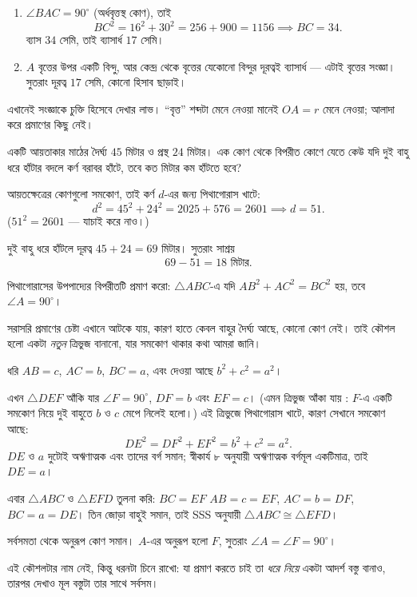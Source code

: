 \documentclass[11pt]{article}
\begin{document}
\begin{sol}
\begin{enumerate}
  \item $\angle BAC = 90^\circ$ (অর্ধবৃত্তস্থ কোণ), তাই
        \[
          BC^2 = 16^2 + 30^2 = 256 + 900 = 1156 \implies BC = 34 .
        \]
        ব্যাস $34$ সেমি, তাই ব্যাসার্ধ $17$ সেমি।
  \item $A$ বৃত্তের উপর একটি বিন্দু, আর কেন্দ্র থেকে বৃত্তের যেকোনো বিন্দুর
        দূরত্বই ব্যাসার্ধ --- এটাই বৃত্তের সংজ্ঞা। সুতরাং দূরত্ব $17$ সেমি,
        কোনো হিসাব ছাড়াই।
\end{enumerate}
এখানেই সংজ্ঞাকে চুক্তি হিসেবে দেখার লাভ। ``বৃত্ত'' শব্দটা মেনে নেওয়া মানেই
$OA = r$ মেনে নেওয়া; আলাদা করে প্রমাণের কিছু নেই।
\end{sol}

 একটি আয়তাকার মাঠের দৈর্ঘ্য $45$ মিটার ও প্রস্থ $24$ মিটার। এক কোণ থেকে
বিপরীত কোণে যেতে কেউ যদি দুই বাহু ধরে হাঁটার বদলে কর্ণ বরাবর হাঁটে, তবে কত মিটার
কম হাঁটতে হবে?

\begin{sol}
আয়তক্ষেত্রের কোণগুলো সমকোণ, তাই কর্ণ $d$-এর জন্য পিথাগোরাস খাটে:
\[
  d^2 = 45^2 + 24^2 = 2025 + 576 = 2601 \implies d = 51 .
\]
($51^2 = 2601$ --- যাচাই করে নাও।)

দুই বাহু ধরে হাঁটলে দূরত্ব $45 + 24 = 69$ মিটার। সুতরাং সাশ্রয়
\[
  69 - 51 = 18 \text{ মিটার}.
\]
\end{sol}

 পিথাগোরাসের উপপাদ্যের বিপরীতটি প্রমাণ করো: $\triangle ABC$-এ যদি
$AB^2 + AC^2 = BC^2$ হয়, তবে $\angle A = 90^\circ$।

\begin{sol}
সরাসরি প্রমাণের চেষ্টা এখানে আটকে যায়, কারণ হাতে কেবল বাহুর দৈর্ঘ্য আছে, কোনো
কোণ নেই। তাই কৌশল হলো একটা \emph{নতুন} ত্রিভুজ বানানো, যার সমকোণ থাকার কথা আমরা
জানি।

ধরি $AB = c$, $AC = b$, $BC = a$, এবং দেওয়া আছে $b^2 + c^2 = a^2$।

এখন $\triangle DEF$ আঁকি যার $\angle F = 90^\circ$, $DF = b$ এবং $EF = c$।
(এমন ত্রিভুজ আঁকা যায় : $F$-এ একটি সমকোণ নিয়ে দুই বাহুতে $b$ ও $c$ মেপে
নিলেই হলো।) এই ত্রিভুজে পিথাগোরাস খাটে, কারণ সেখানে সমকোণ আছে:
\[
  DE^2 = DF^2 + EF^2 = b^2 + c^2 = a^2 .
\]
$DE$ ও $a$ দুটোই অঋণাত্মক এবং তাদের বর্গ সমান; স্বীকার্য ৮ অনুযায়ী অঋণাত্মক
বর্গমূল একটিমাত্র, তাই $DE = a$।

এবার $\triangle ABC$ ও $\triangle EFD$ তুলনা করি: $BC = EF$ $AB = c = EF$, $AC = b = DF$, $BC = a = DE$। তিন জোড়া বাহুই সমান, তাই
SSS অনুযায়ী $\triangle ABC \cong \triangle EFD$।

সর্বসমতা থেকে অনুরূপ কোণ সমান। $A$-এর অনুরূপ হলো $F$, সুতরাং
$\angle A = \angle F = 90^\circ$।

এই কৌশলটার নাম নেই, কিন্তু ধরনটা চিনে রাখো: যা প্রমাণ করতে চাই তা \emph{ধরে
নিয়ে} একটা আদর্শ বস্তু বানাও, তারপর দেখাও মূল বস্তুটা তার সাথে সর্বসম।
\end{sol}
\end{document}
